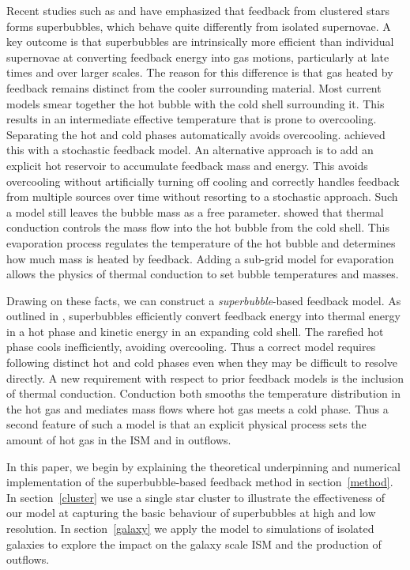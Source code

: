 Recent studies such as \citet{Nath2013} and \citet{Sharma2014} have emphasized
that feedback from clustered stars forms superbubbles, which behave quite
differently from isolated supernovae.   A key outcome is that superbubbles are
intrinsically more efficient than individual supernovae at converting feedback
energy into gas motions, particularly at late times and over larger scales.  The
reason for this difference is that gas heated by feedback remains distinct from
the cooler surrounding material.  Most current models smear together the hot
bubble with the cold shell surrounding it.  This results in an intermediate
effective temperature that is prone to overcooling.   Separating the hot and
cold phases automatically avoids overcooling.  \citet{DallaVecchia2012} achieved
this with a stochastic feedback model.  An alternative approach is to add an
explicit hot reservoir to accumulate feedback mass and energy.  This avoids
overcooling without artificially turning off cooling and correctly handles
feedback from multiple sources over time without resorting to a stochastic
approach.  Such a model still leaves the bubble mass as a free parameter.
\citet{MacLow1988} showed that thermal conduction controls the mass flow into
the hot bubble from the cold shell.  This evaporation process regulates the
temperature of the hot bubble and determines how much mass is heated by
feedback.   Adding a sub-grid model for evaporation allows the physics of
thermal conduction to set bubble temperatures and masses.

Drawing on these facts, we can construct a {\it superbubble}-based feedback
model.  As outlined in \citet{MacLow1988}, superbubbles efficiently convert
feedback energy into thermal energy in a hot phase and kinetic energy in an
expanding cold shell.  The rarefied hot phase cools inefficiently, avoiding
overcooling.  Thus a correct model requires following distinct hot and cold
phases even when they may be difficult to resolve directly.  A new requirement
with respect to prior feedback models is the inclusion of thermal conduction.
Conduction both smooths the temperature distribution in the hot gas and mediates
mass flows where hot gas meets a cold phase.  Thus a second feature of such a
model is that an explicit physical process sets the amount of hot gas in the ISM
and in outflows.

In this paper, we begin by explaining the theoretical underpinning and
numerical implementation of the superbubble-based feedback method in section~\ref{method}. 
In section~\ref{cluster} we use a single star cluster to illustrate the
effectiveness of our model at capturing the basic behaviour of superbubbles at
high and low resolution.  In section~\ref{galaxy} we apply the model to
simulations of isolated galaxies to explore the impact on the galaxy
scale ISM and the production of outflows.  

